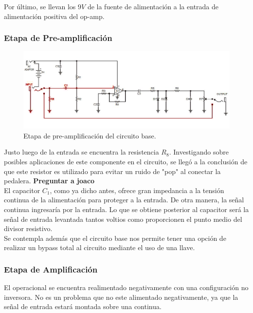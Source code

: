 Por último, se llevan los $9V$ de la fuente de alimentación a la entrada de alimentación positiva del op-amp.


\subsubsection{Etapa de Pre-amplificación}

\begin{figure}[H]
	\centering
	\includegraphics[width=1\textwidth, trim={0 0 0 0}, clip]{Ejercicio5/Imagenes/Circuito_base/circuito_base_preamplificacion.png}
	\caption{Etapa de pre-amplificación del circuito base.}
	\label{fig:circuito_base_preamplificacion}
\end{figure}

Justo luego de la entrada se encuentra la resistencia $R_8$. Investigando sobre posibles aplicaciones de este componente en el circuito, se llegó a la conclusión de que este resistor es utilizado para evitar un ruido de "pop" al conectar la pedalera. \textbf{Preguntar a joaco} \\

El capacitor $C_1$, como ya dicho antes, ofrece gran impedancia a la tensión continua de la alimentación para proteger a la entrada. De otra manera, la señal continua ingresaría por la entrada.
Lo que se obtiene posterior al capacitor será la señal de entrada levantada tantos voltios como proporcionen el punto medio del divisor resistivo.\\

Se contempla además que el circuito base nos permite tener una opción de realizar un bypass total al circuito mediante el uso de una llave.

\subsubsection{Etapa de Amplificación}

El operacional se encuentra realimentado negativamente con una configuración no inversora. No es un problema que no este alimentado negativamente, ya que la señal de entrada estará montada sobre una continua.

